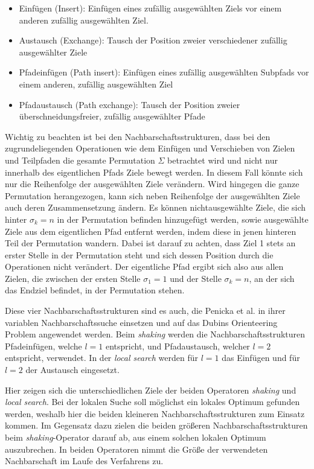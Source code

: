 \documentclass[12pt,a4paper,twoside]{article}
\theoremstyle{definition}
\numberwithin{equation}{section}
\begin{document}
\begin{itemize}
	\item Einfügen (Insert): Einfügen eines zufällig ausgewählten Ziels vor einem anderen zufällig ausgewählten Ziel.
	\item Austausch (Exchange): Tausch der Position zweier verschiedener zufällig ausgewählter Ziele
	\item Pfadeinfügen (Path insert): Einfügen eines zufällig ausgewählten Subpfads vor einem anderen, zufällig ausgewählten Ziel
	\item Pfadaustausch (Path exchange): Tausch der Position zweier überschneidungsfreier, zufällig ausgewählter Pfade
\end{itemize}

Wichtig zu beachten ist bei den Nachbarschaftsstrukturen, dass bei den zugrundeliegenden Operationen wie dem Einfügen und Verschieben von Zielen und Teilpfaden die gesamte Permutation $\Sigma$ betrachtet wird und nicht nur innerhalb des eigentlichen Pfads Ziele bewegt werden. In diesem Fall könnte sich nur die Reihenfolge der ausgewählten Ziele verändern. Wird hingegen die ganze Permutation herangezogen, kann sich neben Reihenfolge der ausgewählten Ziele auch deren Zusammensetzung ändern. Es können nichtausgewählte Ziele, die sich hinter $\sigma_k = n$ in der Permutation befinden hinzugefügt werden, sowie ausgewählte Ziele aus dem eigentlichen Pfad entfernt werden, indem diese in jenen hinteren Teil der Permutation wandern. Dabei ist darauf zu achten, dass Ziel 1 stets an erster Stelle in der Permutation steht und sich dessen Position durch die Operationen nicht verändert. Der eigentliche Pfad ergibt sich also aus allen Zielen, die zwischen der ersten Stelle $\sigma_1 = 1$ und der Stelle $\sigma_k = n$, an der sich das Endziel befindet, in der Permutation stehen.

Diese vier Nachbarschaftsstrukturen sind es auch, die Penicka et al. \cite{R.Penicka.2017} in ihrer variablen Nachbarschaftssuche einsetzen und auf das Dubins Orienteering Problem angewendet werden.
Beim \textit{shaking} werden die Nachbarschaftsstrukturen Pfadeinfügen, welche $l = 1$ entspricht, und Pfadaustausch, welcher $l = 2$ entspricht, verwendet. In der \textit{local search} werden für $l = 1$ das Einfügen und für $l = 2$ der Austausch eingesetzt.

Hier zeigen sich die unterschiedlichen Ziele der beiden Operatoren \textit{shaking} und \textit{local search}. Bei der lokalen Suche soll möglichst ein lokales Optimum gefunden werden, weshalb hier die beiden kleineren Nachbarschaftsstrukturen zum Einsatz kommen. Im Gegensatz dazu zielen die beiden größeren Nachbarschaftsstrukturen beim \textit{shaking}-Operator darauf ab, aus einem solchen lokalen Optimum auszubrechen. In beiden Operatoren nimmt die Größe der verwendeten Nachbarschaft im Laufe des Verfahrens zu.
\end{document}
